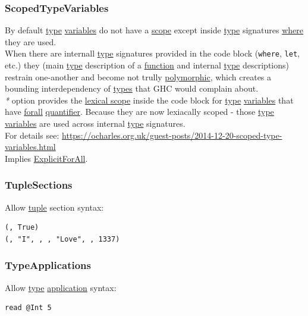 \documentclass[a4paper,14pt,oneside]{book}
\begin{document}
{\subsubsection{\label{org9ff180d}ScopedTypeVariables}
\label{sec:org585139f}
By default \hyperref[orga9ca243]{type} \hyperref[org3e16d0c]{variables} do not have a \hyperref[orgd4e671a]{scope} except inside \hyperref[orga9ca243]{type} signatures \hyperref[org5b6b021]{where} they are used.\\

When there are internall \hyperref[orga9ca243]{type} signatures provided in the code block (\texttt{where}, \texttt{let}, etc.) they (main \hyperref[orga9ca243]{type} description of a \hyperref[org6a60524]{function} and internal \hyperref[orga9ca243]{type} descriptions) restrain one-another and become not trully \hyperref[org1e53622]{polymorphic}, which creates a bounding interdependency of \hyperref[org51532d9]{types} that GHC would complain about.\\

\emph{*} option provides the \hyperref[orga0e6f8f]{lexical scope} inside the code block for \hyperref[orga9ca243]{type} \hyperref[org3e16d0c]{variables} that have \hyperref[org99c9fb1]{forall} \hyperref[org965fc88]{quantifier}. Because they are now lexiacally scoped - those \hyperref[orga9ca243]{type} \hyperref[org3e16d0c]{variables} are used across internal \hyperref[orga9ca243]{type} signatures.\\

For details see: \url{https://ocharles.org.uk/guest-posts/2014-12-20-scoped-type-variables.html}\\

Implies \hyperref[org4aa70b2]{ExplicitForAll}.\\

\subsubsection{\label{org8d8d363}TupleSections}
\label{sec:org536d6f8}
Allow \hyperref[org666c273]{tuple} section syntax:\\
\begin{verbatim}
(, True)
(, "I", , , "Love", , 1337)
\end{verbatim}

\subsubsection{\label{org634b40b}TypeApplications}
\label{sec:org3dea060}
Allow \hyperref[orga9ca243]{type} \hyperref[org623a42d]{application} syntax:\\
\begin{verbatim}
read @Int 5


\end{verbatim}}
\end{document}
